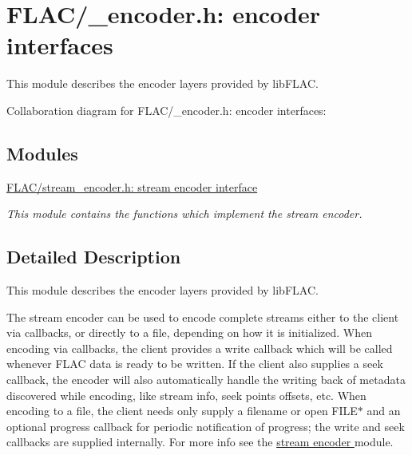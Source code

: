 \hypertarget{group__flac__encoder}{}\section{F\+L\+A\+C/\+\_\+encoder.h\+: encoder interfaces}
\label{group__flac__encoder}


This module describes the encoder layers provided by lib\+F\+L\+AC.  


Collaboration diagram for F\+L\+A\+C/\+\_\+encoder.h\+: encoder interfaces\+:
\subsection*{Modules}
\begin{DoxyCompactItemize}
\item 
\hyperlink{group__flac__stream__encoder}{F\+L\+A\+C/stream\+\_\+encoder.\+h\+: stream encoder interface}
\begin{DoxyCompactList}\small\item\em This module contains the functions which implement the stream encoder. \end{DoxyCompactList}\end{DoxyCompactItemize}


\subsection{Detailed Description}
This module describes the encoder layers provided by lib\+F\+L\+AC. 

The stream encoder can be used to encode complete streams either to the client via callbacks, or directly to a file, depending on how it is initialized. When encoding via callbacks, the client provides a write callback which will be called whenever F\+L\+AC data is ready to be written. If the client also supplies a seek callback, the encoder will also automatically handle the writing back of metadata discovered while encoding, like stream info, seek points offsets, etc. When encoding to a file, the client needs only supply a filename or open {\ttfamily F\+I\+L\+E$\ast$} and an optional progress callback for periodic notification of progress; the write and seek callbacks are supplied internally. For more info see the \hyperlink{group__flac__stream__encoder}{stream encoder } module. 